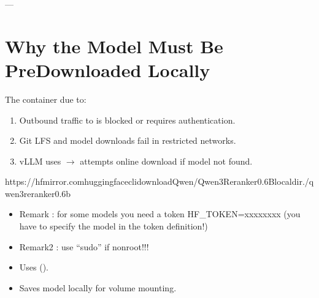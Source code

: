\documentclass[letterpaper,10pt,english]{sphinxmanual}
\begin{document}
\sphinxAtStartPar
—


\section{Why the Model Must Be Pre\sphinxhyphen{}Downloaded Locally}
\label{\detokenize{vllm-cpu:why-the-model-must-be-pre-downloaded-locally}}
\sphinxAtStartPar
The container  due to:
\begin{enumerate}
%
\item {} 
\sphinxAtStartPar
{}
\sphinxhyphen{} Outbound traffic to  is blocked or requires authentication.

\item {} 
\sphinxAtStartPar
{}
\sphinxhyphen{} Git LFS and model downloads fail in restricted networks.

\item {} 
\sphinxAtStartPar
{}
\sphinxhyphen{} vLLM uses  \(\rightarrow\) attempts online download if model not found.

\end{enumerate}

\sphinxAtStartPar
{}

\begin{sphinxVerbatim}[commandchars=\\\{\}]
https://hf\PYGZhy{}mirror.comhuggingface\PYGZhy{}clidownloadQwen/Qwen3\PYGZhy{}Reranker\PYGZhy{}0.6B\PYGZhy{}\PYGZhy{}local\PYGZhy{}dir./qwen3\PYGZhy{}reranker\PYGZhy{}0.6b
\end{sphinxVerbatim}
\begin{itemize}
\item {} 
\sphinxAtStartPar
Remark : for some models you need a token HF\_TOKEN=xxxxxxxx (you have to specify the model in the token definition!)

\item {} 
\sphinxAtStartPar
Remark2 : use “sudo” if non\sphinxhyphen{}root!!!

\item {} 
\sphinxAtStartPar
Uses  ().

\item {} 
\sphinxAtStartPar
Saves model locally for volume mounting.

\end{itemize}
\end{document}
